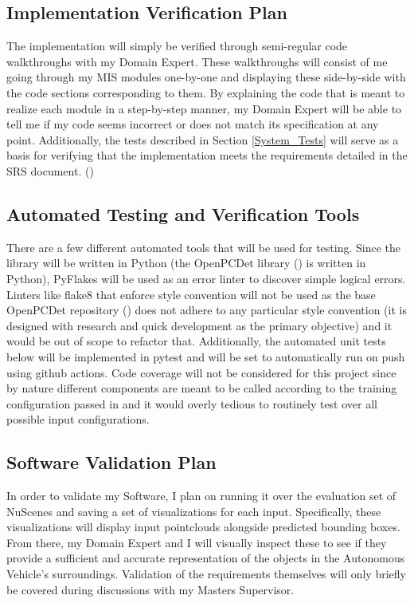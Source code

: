\documentclass[12pt, titlepage]{article}
\begin{document}
\subsection{Implementation Verification Plan} \label{imple_ver}

The implementation will simply be verified through semi-regular code walkthroughs with my Domain Expert.
These walkthroughs will consist of me going through my MIS modules one-by-one and displaying these side-by-side with the
code sections corresponding to them. By explaining the code that is meant to realize each module in a step-by-step manner, 
my Domain Expert will be able to tell me if my code seems incorrect or does not match its specification at any point.
Additionally, the tests described in Section \ref{System_Tests} will serve as a basis for verifying that the 
implementation meets the requirements detailed in the SRS document. (\cite{SRS})

\subsection{Automated Testing and Verification Tools}

There are a few different automated tools that will be used for testing.
Since the library will be written in Python (the OpenPCDet library (\cite{openpcdet2020})
is written in Python), PyFlakes will be used as an error linter to discover
simple logical errors. Linters like flake8 that enforce style convention will
not be used as the base OpenPCDet repository (\cite{openpcdet2020}) does not adhere to any particular
style convention (it is designed with research and quick development as the primary
objective) and it would be out of scope to refactor that. Additionally, the automated
unit tests below will be implemented in pytest and will be set to automatically run
on push using github actions. Code coverage will not be considered for this project
since by nature different components are meant to be called according to the training
configuration passed in and it would overly tedious to routinely test over all possible
input configurations.

\subsection{Software Validation Plan}

In order to validate my Software, I plan on running it over the evaluation set of NuScenes and 
saving a set of visualizations for each input. Specifically, these visualizations will display
input pointclouds alongside predicted bounding boxes. From there, my Domain Expert and I will visually
inspect these to see if they provide a sufficient and accurate representation of the objects in the Autonomous 
Vehicle's surroundings. Validation of the requirements themselves will only 
briefly be covered during discussions with my Masters Supervisor.
\end{document}
